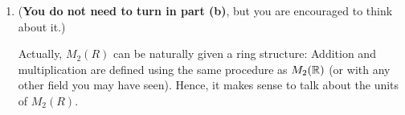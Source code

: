 \documentclass[../psets.tex]{subfiles}
\begin{document}
\begin{enumerate}
\begin{enumerate}[label={(\alph*)}]
\begin{proof}
\begin{equation*}
            \end{equation*}
            Similar statements hold for $b,c,d$. Thus, since $x_1=x_2$ ($x\in\{a,b,c,d\}$), we have that
            \begin{equation*}
                \begin{pmatrix}
                    a_1 & b_1\\
                    c_1 & d_1\\
                \end{pmatrix}
                =
                \begin{pmatrix}
                    a_2 & b_2\\
                    c_2 & d_2\\
                \end{pmatrix}
            \end{equation*}
            as desired.\par
            \underline{Surjectivity}: Let $\varphi\in S_1$ be arbitrary. Suppose $\varphi(X)=a$, $\varphi(Y)=b$, $\varphi(Z)=c$, and $\varphi(W)=d$. Since any polynomial in $\Z[X,Y,Z,W]$ is a $\Z$-linear combination of $X,Y,Z,W$ and $\varphi$ respects these addition and multiplication operations, we have that for any $f\in\Z[X,Y,Z,W]$,
            \begin{equation*}
                \varphi(f) = f(a,b,c,d) = \ev_{(a,b,c,d)}(f)
            \end{equation*}
            Therefore,
            \begin{equation*}
                \psi\left[
                    \begin{pmatrix}
                        a & b\\
                        c & d\\
                    \end{pmatrix}
                \right] = \ev_{(a,b,c,d)} = \varphi
            \end{equation*}
            as desired.
        \end{proof}
        \item (\textbf{You do not need to turn in part (b)}, but you are encouraged to think about it.)\par
        Actually, $M_2(R)$ can be naturally given a ring structure: Addition and multiplication are defined using the same procedure as $M_2(\mathbb{R})$ (or with any other field you may have seen). Hence, it makes sense to talk about the units of $M_2(R)$.\par

\end{enumerate}
\end{enumerate}
\end{document}
